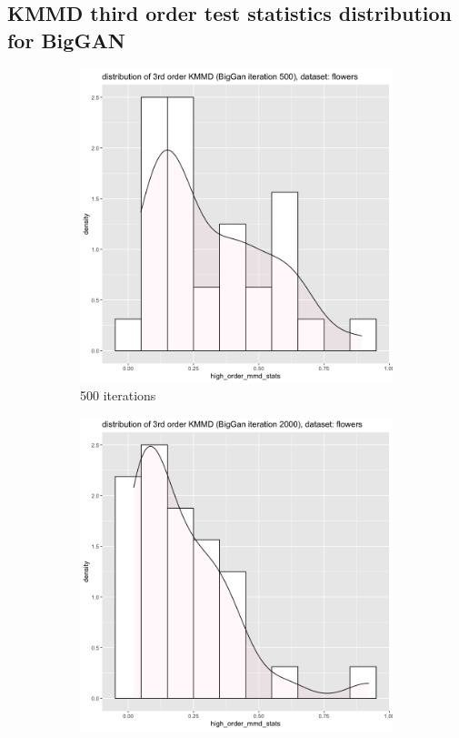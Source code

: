 \documentclass{article}
\begin{document}
\subsection*{KMMD third order test statistics distribution for BigGAN}
\begin{figure}[h!]
    \caption{Dataset Flower}
     \centering
     \begin{subfigure}[b]{0.3\textwidth}
         \centering
         \includegraphics[width=\textwidth]{kmmd_figures/biggan_flower_highdist_500.png}
         \caption{500 iterations}
     \end{subfigure}
     \hfill
     \begin{subfigure}[b]{0.3\textwidth}
         \centering
         \includegraphics[width=\textwidth]{kmmd_figures/biggan_flower_highdist_2000.png}

\end{subfigure}
\end{figure}
\end{document}
